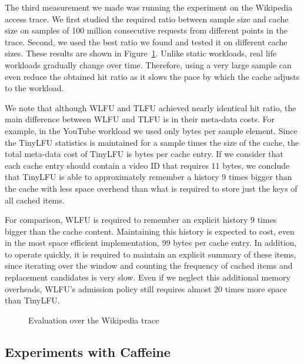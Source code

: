 \documentclass[10pt,a4paper]{article}
\begin{document}
The third measurement we made was running the experiment on the Wikipedia access trace.
We first studied the required ratio between sample size and cache size on samples of 100 million consecutive requests from different points in the trace.
Second, we used the best ratio we found and tested it on different cache sizes. These results are shown in Figure~\ref{fig:Wiki}. Unlike static workloads, real life workloads
gradually change over time. Therefore, using a very large sample can even reduce the obtained hit ratio as it slows the pace by which the cache adjusts to the workload.


We note that although WLFU and TLFU achieved nearly identical hit ratio, the main difference between WLFU and TLFU is in their meta-data costs.
For example, in the YouTube workload we used only  bytes per sample element.
Since the TinyLFU statistics is maintained for a sample  times the size of the cache, the total meta-data cost of TinyLFU is  bytes per cache entry.
If we consider that each cache entry should contain a video ID that requires 11 bytes, we conclude that TinyLFU is able to approximately remember a history 9 times bigger than the cache
with less space overhead than what is required to store just the keys of all cached items.

For comparison, WLFU is required to remember an explicit history 9 times bigger than the cache content.
Maintaining this history is expected to cost, even in the most space efficient implementation, 99 bytes per cache entry.
In addition, to operate quickly, it is required to maintain an explicit summary of these items, since iterating over the window and counting the frequency of cached items and replacement candidates is very slow.
Even if we neglect this additional memory overheads, WLFU's admission policy still requires almost 20 times more space than TinyLFU.

\begin{figure}[t]
\caption{Evaluation over the Wikipedia trace}
\label{fig:Wiki}
\end{figure}

\subsection{Experiments with Caffeine}
\label{sec:realruns}
\end{document}
